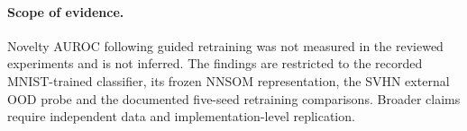 \documentclass[11pt]{article}
\begin{document}
\paragraph{Scope of evidence.} Novelty AUROC following guided retraining was not measured in the reviewed experiments and is not inferred. The findings are restricted to the recorded MNIST-trained classifier, its frozen NNSOM representation, the SVHN external OOD probe and the documented five-seed retraining comparisons. Broader claims require independent data and implementation-level replication.

\clearpage
\printbibliography[title={References}]
\end{document}
